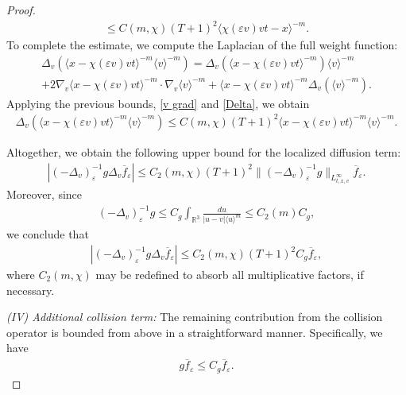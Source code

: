 \documentclass[reqno,11pt,final]{amsart}
\theoremstyle{plain}
\numberwithin{equation}{section}
\numberwithin{theorem}{section}
\begin{document}
\begin{proof}
\begin{multline}
\le C(m,\chi)(T+1)^2 \langle \chi(\varepsilon v)vt - x\rangle^{-m}.\label{Delta}
\end{multline}
To complete the estimate, we compute the Laplacian of the full weight function:
\begin{multline*}
\Delta_v\left(\langle x-\chi(\varepsilon v)vt\rangle^{-m} \langle v\rangle^{-m}\right) = \Delta_v\left(\langle x-\chi(\varepsilon v)vt\rangle^{-m}\right)\langle v\rangle^{-m} \\ +2\nabla_v\langle x-\chi(\varepsilon v)vt\rangle^{-m}\cdot\nabla_v\langle v\rangle^{-m} +
\langle x-\chi(\varepsilon v)vt\rangle^{-m}\Delta_v\left(\langle v\rangle^{-m}\right).
\end{multline*}Applying the previous bounds, \eqref{v grad} and \eqref{Delta}, we obtain
\begin{align}\label{total Delta}
 \Delta_v\left(\langle x-\chi(\varepsilon v)vt\rangle^{-m} \langle v\rangle^{-m}\right)\le C(m,\chi)(T+1)^2\langle x-\chi(\varepsilon v)vt\rangle^{-m}\langle v\rangle^{-m}.
\end{align}

Altogether, we obtain the following upper bound for the localized diffusion term:
\begin{align*}
|(-\Delta_v)_\varepsilon^{-1}g\Delta_v\overline{f}_\varepsilon| \le C_2(m,\chi)(T+1)^2\lVert (-\Delta_v)_\varepsilon^{-1}g\rVert_{L^\infty_{t,x,v}} \overline{f}_\varepsilon.
\end{align*}Moreover, since
\begin{align*}
(-\Delta_v)_\varepsilon^{-1}g \le C_g \int_{\mathbb{R}^3} \frac{du}{|u-v|\langle u\rangle^m} \le C_2(m)C_g,
\end{align*}we conclude that
\begin{align}\label{Coll1 est}
|(-\Delta_v)_\varepsilon^{-1}g\Delta_v\overline{f}_\varepsilon| \le C_2(m,\chi)(T+1)^2C_g\overline{f}_\varepsilon,
\end{align}where $C_2(m,\chi)$ may be redefined to absorb all multiplicative factors, if necessary.

\noindent \textit{(IV) Additional collision term: }The remaining contribution from the collision operator is bounded from above in a straightforward manner. Specifically, we have
\begin{align}\label{Coll2 est}
g\overline{f}_\varepsilon \le C_g \overline{f}_\varepsilon.
\end{align}


\end{proof}
\end{document}
